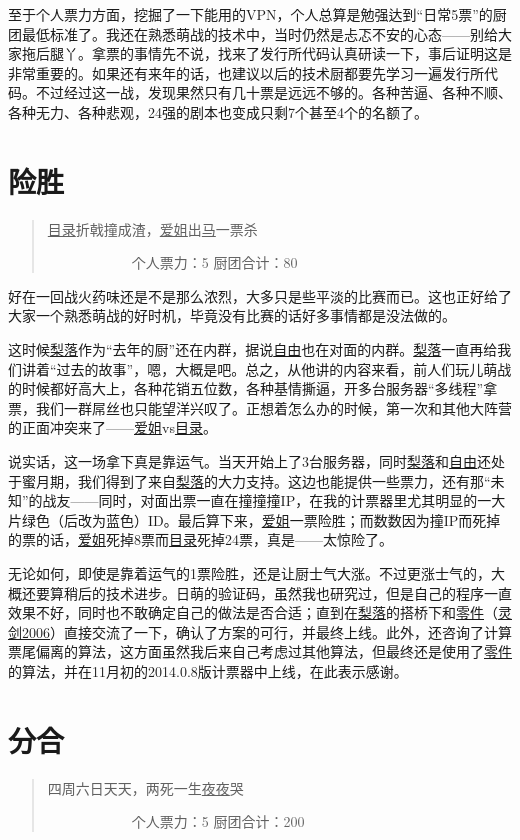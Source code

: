 至于个人票力方面，挖掘了一下能用的VPN，个人总算是勉强达到“日常5票”的厨团最低标准了。我还在熟悉萌战的技术中，当时仍然是忐忑不安的心态——别给大家拖后腿丫。拿票的事情先不说，找来了发行所代码认真研读一下，事后证明这是非常重要的。如果还有来年的话，也建议以后的技术厨都要先学习一遍发行所代码。不过经过这一战，发现果然只有几十票是远远不够的。各种苦逼、各种不顺、各种无力、各种悲观，24强的剧本也变成只剩7个甚至4个的名额了。


\chapter{险胜}
\begin{quote}
\uline{目录}折戟撞成渣，\uline{爱姐}出\uline{马}一票杀

　　　　　　个人票力：5 厨团合计：80
\end{quote}

好在一回战火药味还是不是那么浓烈，大多只是些平淡的比赛而已。这也正好给了大家一个熟悉萌战的好时机，毕竟没有比赛的话好多事情都是没法做的。

这时候\uline{梨落}作为“去年的厨”还在内群，据说\uline{自由}也在对面的内群。\uline{梨落}一直再给我们讲着“过去的故事”，嗯，大概是吧。总之，从他讲的内容来看，前人们玩儿萌战的时候都好高大上，各种花销五位数，各种基情撕逼，开多台服务器“多线程”拿票，我们一群屌丝也只能望洋兴叹了。正想着怎么办的时候，第一次和其他大阵营的正面冲突来了——\uline{爱姐}vs\uline{目录}。

说实话，这一场拿下真是靠运气。当天开始上了3台服务器，同时\uline{梨落}和\uline{自由}还处于蜜月期，我们得到了来自\uline{梨落}的大力支持。这边也能提供一些票力，还有那“未知”的战友——同时，对面出票一直在撞撞撞IP，在我的计票器里尤其明显的一大片绿色（后改为蓝色）ID。最后算下来，\uline{爱姐}一票险胜；而数数因为撞IP而死掉的票的话，\uline{爱姐}死掉8票而\uline{目录}死掉24票，真是——太惊险了。

无论如何，即使是靠着运气的1票险胜，还是让厨士气大涨。不过更涨士气的，大概还要算稍后的技术进步。日萌的验证码，虽然我也研究过，但是自己的程序一直效果不好，同时也不敢确定自己的做法是否合适；直到在\uline{梨落}的搭桥下和\uline{零件}（\uline{灵剑2006}）直接交流了一下，确认了方案的可行，并最终上线。此外，还咨询了计算票尾偏离的算法，这方面虽然我后来自己考虑过其他算法，但最终还是使用了\uline{零件}的算法，并在11月初的2014.0.8版计票器中上线，在此表示感谢。

\chapter{分合}
\begin{quote}
四周六日天天，两死一生\uline{夜夜}哭

　　　　　　个人票力：5 厨团合计：200
\end{quote}

